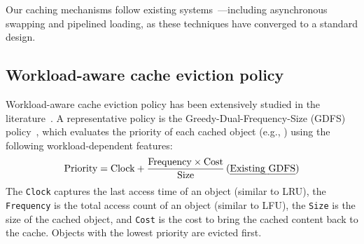 Our caching mechanisms follow 
existing systems~\cite{cachedattention, vllm, sglang, DBLP:journals/corr/abs-2403-14401}---including
asynchronous swapping and pipelined loading,
as these techniques have converged to a standard design. 


\subsection{Workload-aware {\kvcache} cache eviction policy}
\label{sec:design-policy}

Workload-aware cache eviction policy has been extensively studied in the literature~\cite{cherkasova1998improving,lruk,slru,lirs,arc,lhd,cacheus}.
A representative policy is the Greedy-Dual-Frequency-Size (GDFS) policy~\cite{cherkasova1998improving}, 
which evaluates the priority of each cached object (e.g., {\kvcache}) 
using the following workload-dependent features: 
$$
\text{Priority} = \text{Clock} + \frac{\text{Frequency} \times \text{Cost}}{\text{Size}}\,(\text{\uline{Existing GDFS}})
$$
The \texttt{Clock} captures the last access time of an object (similar to LRU),
the \texttt{Frequency} is the total access count of an object (similar to LFU),
the \texttt{Size} is the size of the cached object,
and \texttt{Cost} is the cost to bring the cached content back to the cache.
Objects with the lowest priority are evicted first.


